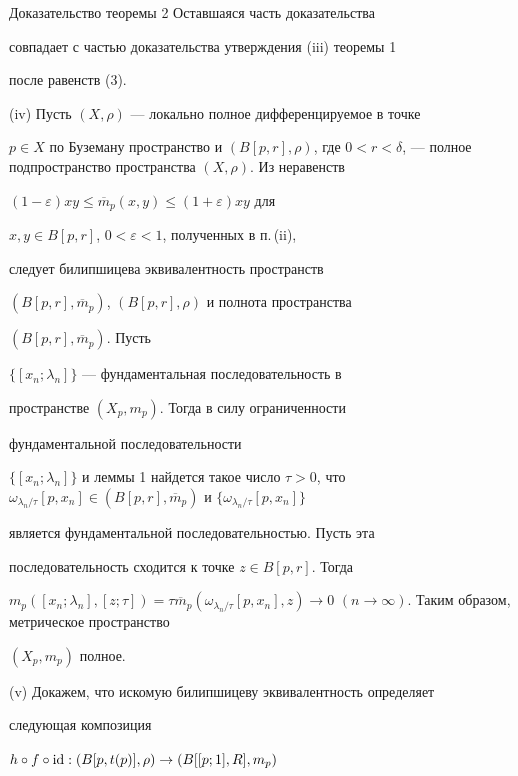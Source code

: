\begin{pf*}{Доказательство теоремы 2}
Оставшаяся часть доказательства


совпадает с частью доказательства утверждения (iii) теоремы 1


после равенств (3).





(iv) Пусть $(X,\rho)$ --- локально полное дифференцируемое в точке


$p \in X$ по Буземану пространство и $(B[p,r],\rho)$, где $0<r<


\delta$, --- полное подпространство пространства $(X,\rho)$. Из неравенств


$(1-\varepsilon)xy \leq \overline{m}_{p}( x, y) \leq (1+\varepsilon)xy$ для


$x, y \in B[p,r]$, $0<\varepsilon<1$, полученных в п.\,(ii),


следует билипшицева эквивалентность пространств


$(B[p,r],\overline{m}_{p})$, $(B[p,r],\rho)$ и полнота пространства


$(B[p,r],\overline{m}_{p})$. Пусть


$\{[x_n;\lambda_n]\}$ --- фундаментальная последовательность в


пространстве $(X_{p},m_{p})$. Тогда в силу ограниченности


фундаментальной последовательности


$\{[x_n;\lambda_n]\}$ и леммы 1 найдется такое число $\tau >


0$, что $\omega_{\lambda_n/\tau}[p,x_n] \in


(B[p,r],\overline{m}_p)$ и $\{\omega_{\lambda_n/\tau}[p,x_n]\}$


является фундаментальной последовательностью. Пусть эта


последовательность сходится к точке $z \in B[p,r]$. Тогда


$m_{p}([x_n;\lambda_n],[z;\tau])=\tau \overline


{m}_{p}(\omega_{\lambda_n/\tau}[p,x_n],z) \rightarrow 0$ $(n


\rightarrow \infty)$. Таким образом, метрическое пространство


$(X_{p},m_{p})$ полное.





(v) Докажем, что искомую билипшицеву эквивалентность определяет


следующая композиция


$h\circ f\circ \operatorname{id} : (B[p,t(p)],\rho) \rightarrow (B[[p;1],R],m_p)$



\end{pf*}
